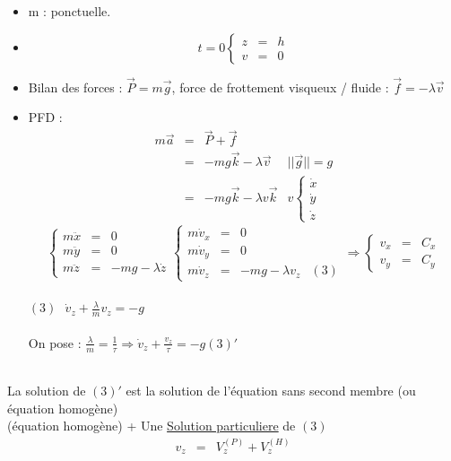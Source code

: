 			\begin{itemize}
				\item m : ponctuelle.
				\item \[t=0 \left\{ \begin{array}{rcl} z&=&h \\
			v &=& 0 \end{array}\right. \]
				\item Bilan des forces : $\vec{P} = m\vec{g}$, force de frottement visqueux / fluide : $\vec{f} = -\lambda \vec{v}$
				\item PFD : \[\begin{array}{rclr}
							m\vec{a} &=& \vec{P} + \vec{f} \\
								   &=& -mg\vec{k} - \lambda \vec{v} & ||\vec{g}|| = g \\
								   &=& -mg\vec{k} - \lambda v\vec{k} & v \left\{ \begin{array}{c}
															\dot{x} \\
															\dot{y} \\
														\dot{z} \end{array} \right.
					\end{array}\] \[\left\{\begin{array}{rcl}
								m\ddot{x} &=&0 \\
								m\ddot{y} &=&0 \\
						m\ddot{z} &=& -mg-\lambda \dot{z} \end{array} \right.
								\left\{\begin{array}{rclr}
									m\dot{v}_x &=& 0 \\
									m\dot{v}_y &=& 0 \\
									m\dot{v}_z &=& -mg - \lambda v_z &(3) \end{array} \right. \Rightarrow \left\{\begin{array}{rcl}
										v_x &=& C_x \\
										v_y &=& C_y
								\end{array}\right.\]
								~\\

$(3) \text{ } \dot{v}_z + \frac{\lambda}{m}v_z = -g$ ~\\
~\\
On pose : $\frac{\lambda}{m} = \frac{1}{\tau} \Rightarrow \dot{v}_z + \frac{v_z}{\tau} = -g (3)'$ 
			\end{itemize}
			~\\

La solution de $(3)'$ est la solution de l'équation sans second membre (ou équation homogène) ~\\
				 (équation homogène) + Une \ul{Solution particuliere} de $(3)$ ~\\
				\[\begin{array}{rcl}
					v_z &=& V_z^{(P)} + V_z^{(H)}
				\end{array}\]
				~\\

